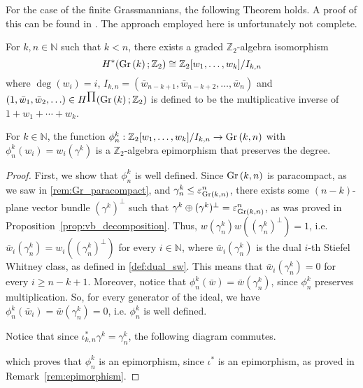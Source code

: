 For the case of the finite Grassmannians, the following Theorem holds. A proof of this can be found in \cite{borel}. The approach employed here is unfortunately not complete.
\begin{theorem}\label{thm:cohomology_finite_gr} For $k,n\in\mathbb{N}$ such that $k<n$, there exists a graded $\mathbb{Z}_2$-algebra isomorphism
\[H^*(\Gr{k};\mathbb{Z}_2)\cong\mathbb{Z}_2[w_1,\ldots,w_k]/I_{k,n}\]
where $\deg(w_i)=i$, $I_{k,n}=(\bar{w}_{n-k+1},\bar{w}_{n-k+2},\ldots,\bar{w}_n)$ and $(1,\bar{w}_1,\bar{w}_2,\ldots)\in H^{\prod}(\Gr{k};\mathbb{Z}_2)$ is defined to be the multiplicative inverse of $1+w_1+\cdots+w_k$.
\end{theorem}

\begin{lemma} For $k\in\mathbb{N}$, the function $\phi_n^k:\mathbb{Z}_2[w_1,\ldots,w_k]/I_{k,n}\to\Gr{k}{n}$ with $\phi_n^k(w_i)=w_i(\gamma^k)$ is a $\mathbb{Z}_2$-algebra epimorphism that preserves the degree.
\end{lemma}
\begin{proof} First, we show that $\phi_n^k$ is well defined. Since $\Gr{k}{n}$ is paracompact, as we saw in \ref{rem:Gr_paracompact}, and $\gamma_n^k\leq\varepsilon_{\Gr{k}{n}}^n$, there exists some $(n-k)$-plane vector bundle $(\gamma^k)^{\perp}$ such that $\gamma^k\oplus(\gamma^k)^{\perp}=\varepsilon_{\Gr{k}{n}}^n$, as was proved in Proposition~\ref{prop:vb_decomposition}. Thus, $w(\gamma_n^k)w((\gamma_n^k)^{\perp})=1$, i.e. $\bar{w}_i(\gamma_n^k)=w_i((\gamma_n^k)^{\perp})$ for every $i\in\mathbb{N}$, where $\bar{w}_i(\gamma_n^k)$ is the dual $i$-th Stiefel Whitney class, as defined in \ref{def:dual_sw}. This means that $\bar{w}_i(\gamma_n^k)=0$ for every $i\geq n-k+1$. Moreover, notice that $\phi_n^k(\bar{w})=\bar{w}(\gamma_n^k)$, since $\phi_n^k$ preserves multiplication. So, for every generator of the ideal, we have $\phi_n^k(\bar{w}_{i})=\bar{w}(\gamma_n^k)=0$, i.e. $\phi_n^k$ is well defined.

Notice that since $\iota_{k,n}^*\gamma^k=\gamma_n^k$, the following diagram commutes.
\begin{center}
\end{center}
which proves that $\phi_n^k$ is an epimorphism, since $\iota^*$ is an epimorphism, as proved in Remark~\ref{rem:epimorphism}.
\end{proof}
